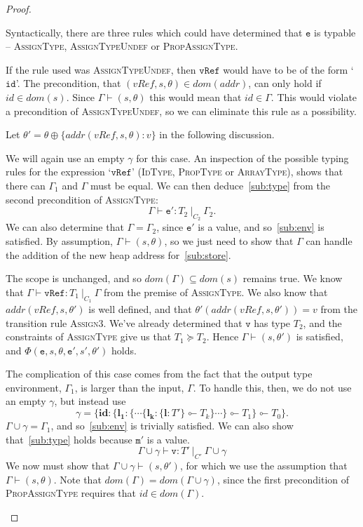 \documentclass[12pt,a4paper,twoside,openright]{report}
\theoremstyle{definition}
\theoremstyle{dotless}
\newcommand*{\orig}{\ensuremath{\!\multimapinv\!}}
\begin{document}
\begin{proof}
\begin{case}[Assign]
	Syntactically, there are three rules which could have determined that
	$\mathtt{e}$ is typable -- \textsc{AssignType}, \textsc{AssignTypeUndef} or
	\textsc{PropAssignType}. 

	If the rule used was \textsc{AssignTypeUndef}, then $\mathtt{vRef}$ would
	have to be of the form `$\mathtt{id}$'. The precondition, that $(vRef,s,
	\theta)\in dom(addr)$, can only hold if $id\in dom(s)$. Since
	$\Gamma\vdash(s,\theta)$ this would mean that $id\in\Gamma$. This would
	violate a precondition of \textsc{AssignTypeUndef}, so we can eliminate
	this rule as a possibility.

	Let $\theta'=\theta\oplus\{addr(vRef,s,\theta):v\}$ in the following discussion.

	\begin{subcase}[AssignType]
	  We will again use an empty $\gamma$ for this case.
	  An inspection of the possible typing rules for the expression `$\mathtt{vRef}$'
	  (\textsc{IdType, PropType} or \textsc{ArrayType}), shows that there can
	  $\Gamma_1$ and $\Gamma$ must be equal.
	  We can then deduce~\eqref{sub:type} from the second precondition of \textsc{AssignType}:
	  $$\Gamma\vdash\mathtt{e'}:T_2\ |_{C_2}\ \Gamma_2.$$ 
	  We can also determine that $\Gamma=\Gamma_2$, since $\mathtt{e'}$ is a value, and
	  so~\eqref{sub:env} is satisfied. By assumption, $\Gamma\vdash(s,\theta)$, so
	  we just need to show that
	  $\Gamma$ can handle the addition of the new heap address for~\eqref{sub:store}.

 	  The scope is unchanged, and so $dom(\Gamma)\subseteq dom(s)$ remains true.
	  We know that $\Gamma\vdash\mathtt{vRef}:T_1\ |_{C_1}\ \Gamma$ from the premise of 
	  \textsc{AssignType}. We also know that $addr(vRef, s, \theta')$ is 
	  well defined, and that $\theta'(addr(vRef, s, \theta')) = v$ 
	  from the transition rule \textsc{Assign3}. We've already determined
	  that $\mathtt{v}$ has type $T_2$, and the constraints of \textsc{AssignType}
	  give us that $T_1\succeq T_2$. Hence $\Gamma\vdash(s,\theta')$ is satisfied,
	  and $\Phi(\mathtt{e},s,\theta,\mathtt{e'},s',\theta')$ holds.
  	\end{subcase}

	\begin{subcase}[PropAssignType]
	  The complication of this case comes from
	  the fact that the output type environment, $\Gamma_1$, is larger than the input, $\Gamma$.
	  To handle this, then, we do not use an empty $\gamma$, but instead use
	  $$\gamma=\{\textbf{id}: \{ \mathbf{l_1}: \{\cdots \{\mathbf{l_k}:\{\mathbf{l}: T'\}\orig T_k \} \cdots\} \orig T_1\}\orig T_0\}.$$
	  $\Gamma\!\cup\!\gamma=\Gamma_1$, and so~\eqref{sub:env} is trivially
	  satisfied. We can also show that~\eqref{sub:type} holds because $\mathtt{m'}$ is a value.
	  $$\Gamma\!\cup\!\gamma\vdash\mathtt{v}:T'\ |_{C'}\ \Gamma\!\cup\!\gamma$$
	  We now must show that $\Gamma\!\cup\!\gamma\vdash(s,
	  \theta')$, for which we use the assumption that
	  $\Gamma\vdash(s,\theta)$. Note that
	  $dom(\Gamma)=dom(\Gamma\cup\gamma)$, since the first precondition
	  of \textsc{PropAssignType} requires that $id\in dom(\Gamma)$.


\end{subcase}
\end{case}
\end{proof}
\end{document}
